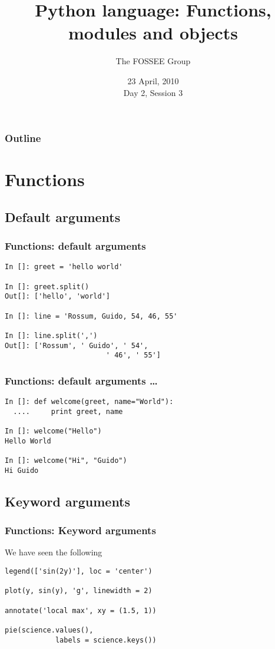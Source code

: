\documentclass[14pt,compress]{beamer}
\title[Basic Python]{Python language: Functions, modules and objects}
\author[FOSSEE Team] {The FOSSEE Group}
\institute[IIT Bombay] {Department of Aerospace Engineering\\IIT Bombay}
\date[] {23 April, 2010\\Day 2, Session 3}
\begin{document}
\begin{frame}
  \titlepage
\end{frame}

\begin{frame}
  \frametitle{Outline}
  \tableofcontents
\end{frame}

\section{Functions}
\subsection{Default arguments}
\begin{frame}[fragile]
  \frametitle{Functions: default arguments}
  \begin{lstlisting}
In []: greet = 'hello world'

In []: greet.split()
Out[]: ['hello', 'world']

In []: line = 'Rossum, Guido, 54, 46, 55'

In []: line.split(',')
Out[]: ['Rossum', ' Guido', ' 54',
                        ' 46', ' 55']
  \end{lstlisting}
\end{frame}

\begin{frame}[fragile]
  \frametitle{Functions: default arguments \ldots}
  \begin{lstlisting}
In []: def welcome(greet, name="World"):
  ....     print greet, name

In []: welcome("Hello")
Hello World

In []: welcome("Hi", "Guido")
Hi Guido
  \end{lstlisting}
\end{frame} 

\subsection{Keyword arguments}
\begin{frame}[fragile]
  \frametitle{Functions: Keyword arguments}
We have seen the following
\begin{lstlisting}
legend(['sin(2y)'], loc = 'center')

plot(y, sin(y), 'g', linewidth = 2)

annotate('local max', xy = (1.5, 1))

pie(science.values(), 
            labels = science.keys())
  \end{lstlisting}
\end{frame}
\end{document}
